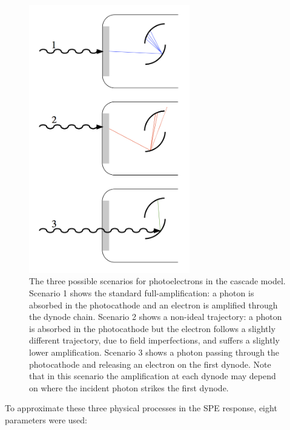 \begin{figure}[t]
\centering
\includegraphics[width=7cm]{final_pmt_diagram_2.png}
\caption{The three possible scenarios for photoelectrons in the cascade model.  Scenario 1 shows the standard full-amplification: a photon is absorbed in the photocathode and an electron is amplified through the dynode chain.  Scenario 2 shows a non-ideal trajectory: a photon is absorbed in the photocathode but the electron follows a slightly different trajectory, due to field imperfections, and suffers a slightly lower amplification.  Scenario 3 shows a photon passing through the photocathode and releasing an electron on the first dynode.  Note that in this scenario  the amplification at each dynode may depend on where the incident photon strikes the first dynode.}
\label{fig:fig-pmt_diagram}
\end{figure}

To approximate these three physical processes in the SPE response, eight parameters were used:

